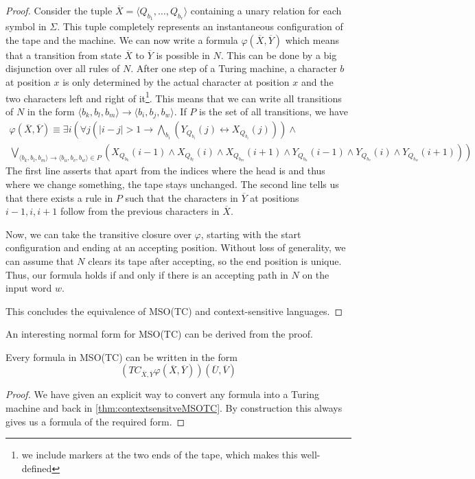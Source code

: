 \begin{proof}
    Consider the tuple $\overline{X} = \langle Q_{b_1}, \dots, Q_{b_r} \rangle$ containing a unary relation for each symbol in $\Sigma$.
    This tuple completely represents an instantaneous configuration of the tape and the machine.
    We can now write a formula $\varphi(\overline{X}, \overline{Y})$ which means that a transition from state $\overline{X}$ to $\overline{Y}$ is possible in $N$.
    This can be done by a big disjunction over all rules of $N$.
    After one step of a Turing machine, a character $b$ at position $x$ is only determined by the actual character at position $x$ and the two characters left and right of it\footnote{we include markers at the two ends of the tape, which makes this well-defined}.
    This means that we can write all transitions of $N$ in the form $\langle b_{k},b_{l},b_{m}\rangle \to \langle b_{i}, b_{j}, b_{w} \rangle$.
    If $P$ is the set of all transitions, we have
    \begin{multline*}
        \varphi(\overline{X}, \overline{Y}) \equiv \exists i \left(\forall j \left(|i - j| > 1 \to \bigwedge_{b_i}\left(Y_{Q_{b_i}}(j) \leftrightarrow X_{Q_{b_i}}(j)\right)\right) \land \right. \\
        \left. \bigvee_{\langle b_{k},b_{l},b_{m}\rangle \to \langle b_{u}, b_{v}, b_{w} \rangle \in P} \left(X_{Q_{b_{k}}}(i - 1) \land X_{Q_{b_{l}}}(i) \land X_{Q_{b_{m}}}(i + 1) \land Y_{Q_{b_{u}}}(i - 1) \land Y_{Q_{b_{v}}}(i) \land Y_{Q_{b_{w}}}(i + 1) \right)\right)
    \end{multline*}
    The first line asserts that apart from the indices where the head is and thus where we change something, the tape stays unchanged.
    The second line tells us that there exists a rule in $P$ such that the characters in $\overline{Y}$ at positions $i - 1, i, i + 1$ follow from the previous characters in $\overline{X}$.

    Now, we can take the transitive closure over $\varphi$, starting with the start configuration and ending at an accepting position.
    Without loss of generality, we can assume that $N$ clears its tape after accepting, so the end position is unique.
    Thus, our formula holds if and only if there is an accepting path in $N$ on the input word $w$.

    This concludes the equivalence of MSO(TC) and context-sensitive languages.
\end{proof}

An interesting normal form for MSO(TC) can be derived from the proof.
\begin{corollary}
    Every formula in MSO(TC) can be written in the form
    \[
        \left( TC_{\overline{X}, \overline{Y}} \varphi(\overline{X}, \overline{Y}) \right)\left( \overline{U}, \overline{V} \right)
    \]
\end{corollary}

\begin{proof}
    We have given an explicit way to convert any formula into a Turing machine and back in \cref{thm:contextsensitveMSOTC}.
    By construction this always gives us a formula of the required form.
\end{proof}